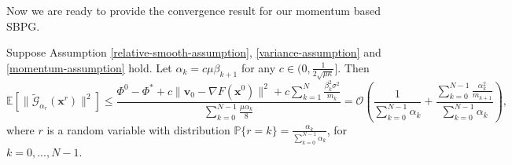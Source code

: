 \documentclass[twoside,11pt]{article}
\newcommand{\E}{\mathbb{E}}
\def\vv{{\bm{v}}}
\def\vx{{\bm{x}}}
\begin{document}
Now we are ready to provide the convergence result for our momentum based SBPG. 
\begin{theorem}
Suppose Assumption \ref{relative-smooth-assumption}, \ref{variance-assumption} and \ref{momentum-assumption} hold. Let $\alpha_k=c\mu\beta_{k+1}$ for any $c\in(0,\frac{1}{2\sqrt{\mu\kappa}}]$. Then
\[
\E[\|\widetilde{\mathcal G}_{\alpha_r}(\vx^{r})\|^2]\leq\frac{\Phi^0-\Phi^*+c\|\vv_0-\nabla F(\vx^0)\|^2+c\sum_{k=1}^N\frac{\beta_k^2\sigma^2}{m_k}}{\sum_{k=0}^{N-1}\frac{\mu\alpha_k}{8}}=\mathcal{O}\left(\frac{1}{\sum_{k=0}^{N-1}\alpha_k}+\frac{\sum_{k=0}^{N-1}\frac{\alpha_k^2}{m_{k+1}}}{\sum_{k=0}^{N-1}\alpha_k}\right),
\]
where $r$ is a random variable with distribution $\mathbb{P}\{r=k\}=\frac{\alpha_k}{\sum_{k=0}^{N-1}\alpha_k}$, for $k=0,...,N-1$.
\label{momentum-convergence-thm}
\end{theorem}
\end{document}

